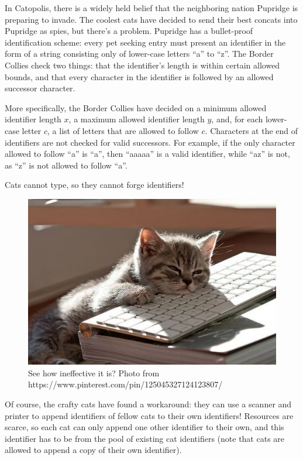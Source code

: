 
In Catopolis, there is a widely held belief that the neighboring nation Pupridge is preparing to invade.
The coolest cats have decided to send their best concats into Pupridge as spies, but there's a problem.
Pupridge has a bullet-proof identification scheme: every pet seeking entry must present an identifier in
the form of a string consisting only of lower-case letters ``a'' to ``z''.
The Border Collies check two things: that the identifier's length is within certain allowed bounds, and that 
every character in the identifier is followed by an allowed successor character. 

More specifically, the Border Collies have decided on a minimum allowed identifier length $x$, a maximum
allowed identifier length $y$, and, for each lower-case letter $c$, a list of letters that are allowed
to follow $c$. Characters at the end of identifiers are not checked for valid successors.
For example, if the only character allowed to follow ``a'' is ``a'', then ``aaaaa'' is a valid identifier,
while ``az'' is not, as ``z'' is not allowed to follow ``a''.

Cats cannot type, so they cannot forge identifiers!

\begin{figure}[h]
	\begin{center}
	\includegraphics[height=0.3\textwidth]{catkeyboard}
	\caption{See how ineffective it is? Photo from https://www.pinterest.com/pin/125045327124123807/}
	\end{center}
\end{figure}

\medskip

Of course, the crafty cats have found a workaround: they can use a scanner and printer to append identifiers 
of fellow cats to their own identifiers! Resources are scarce, so each cat can only append one other
identifier to their own, and this identifier has to be from the pool of existing cat identifiers (note that
cats are allowed to append a copy of their own identifier).

\medskip

